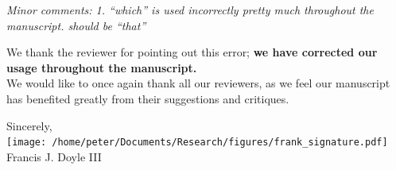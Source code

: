 \documentclass[11pt, letterpaper]{article}
\newenvironment{reviewer}{\itshape\color{gray}}{}
\begin{document}
\begin{reviewer}
Minor comments:
1. ``which'' is used incorrectly pretty much throughout the manuscript. should be ``that''
\end{reviewer}

We thank the reviewer for pointing out this error; {\bfseries we have corrected our usage throughout the manuscript.}\\[3ex]

We would like to once again thank all our reviewers, as we feel our manuscript has benefited greatly from their suggestions and critiques.

\vspace{4ex}
\begin{flushright}
  Sincerely,\\[2ex]

  \texttt{[image: /home/peter/Documents/Research/figures/frank\_signature.pdf]}\\[1ex]
Francis J. Doyle III
\end{flushright}
\end{document}
